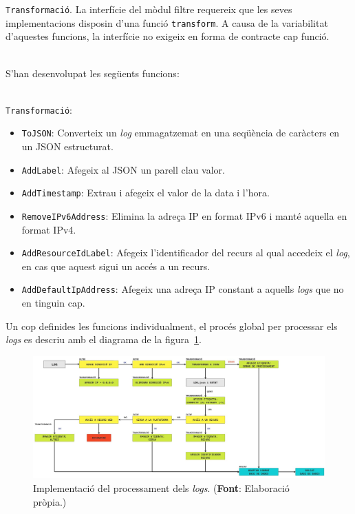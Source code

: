 \noindent
\texttt{Transformació}.
La interfície del mòdul filtre requereix que les seves implementacions disposin d'una funció \texttt{transform}.
A causa de la variabilitat d'aquestes funcions, la interfície no exigeix en forma de contracte cap funció.

\noindent \\
S'han desenvolupat les següents funcions:

\noindent \\
\texttt{Transformació}:
\begin{itemize}
    \item \texttt{ToJSON}: Converteix un \textit{\gls{log}} emmagatzemat en una seqüència de caràcters en un \gls{JSON} estructurat.
    \item \texttt{AddLabel}: Afegeix al JSON un parell clau valor.
    \item \texttt{AddTimestamp}: Extrau i afegeix el valor de la data i l'hora.
    \item \texttt{RemoveIPv6Address}: Elimina la adreça \gls{IP} en format IPv6 i manté aquella en format IPv4.
    \item \texttt{AddResourceIdLabel}: Afegeix l'identificador del recurs al qual accedeix el \textit{log}, en cas que aquest sigui un accés a un recurs.
    \item \texttt{AddDefaultIpAddress}: Afegeix una adreça \gls{IP} constant a aquells \textit{\gls{log}s} que no en tinguin cap.
\end{itemize}

\noindent
Un cop definides les funcions individualment, el procés global per processar els \textit{\gls{log}s} es descriu amb el diagrama de la figura~\ref{fig:log-processing-workflow}.

\noindent
\begin{figure}[htbp]
    \centerline{\includegraphics[width=1.1\textwidth]{figures/log-processing-workflow}}
    \captionsetup{justification=centering}
    \caption[Implementació del processament dels \textit{logs}.]{Implementació del processament dels \textit{logs}. (\textbf{Font}: Elaboració pròpia.)}\label{fig:log-processing-workflow}
\end{figure}